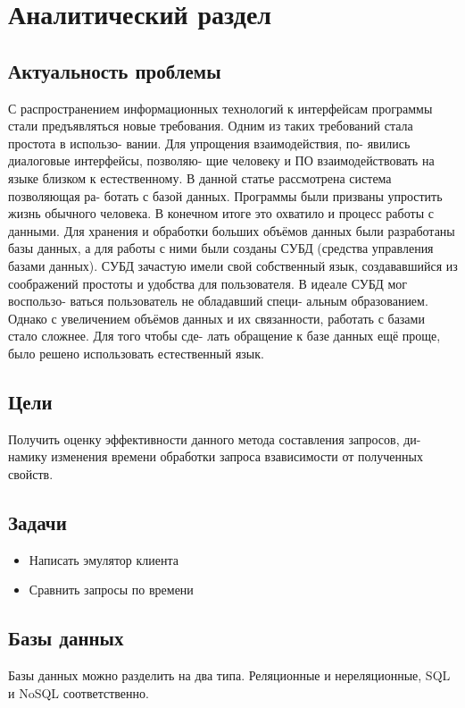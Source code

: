 \chapter{Аналитический раздел}
\label{cha:analysis}
%
%
\section{Актуальность проблемы}
С распространением информационных
технологий к интерфейсам программы стали
предъявляться новые требования. Одним из
таких требований стала простота в использо-
вании. Для упрощения взаимодействия, по-
явились диалоговые интерфейсы, позволяю-
щие человеку и ПО взаимодействовать на
языке близком к естественному. В данной
статье рассмотрена система позволяющая ра-
ботать с базой данных.
Программы были призваны упростить
жизнь обычного человека. В конечном итоге
это охватило и процесс работы с данными.
Для хранения и обработки больших объёмов
данных были разработаны базы данных, а для
работы с ними были созданы СУБД (средства
управления базами данных). СУБД зачастую
имели свой собственный язык, создававшийся
из соображений простоты и удобства для
пользователя. В идеале СУБД мог воспользо-
ваться пользователь не обладавший специ-
альным образованием. Однако с увеличением
объёмов данных и их связанности, работать с
базами стало сложнее. Для того чтобы сде-
лать обращение к базе данных ещё проще,
было решено использовать естественный
язык.
\section{Цели}
Получить оценку эффективности данного метода составления запросов, ди-
намику изменения времени обработки запроса взависимости от полученных
свойств.
\section{Задачи}
\begin{itemize}
\item Написать эмулятор клиента
\item Сравнить запросы по времени
\end{itemize}



\section{Базы данных}

Базы данных можно разделить на два типа. Реляционные и нереляционные, SQL и NoSQL соответственно.
